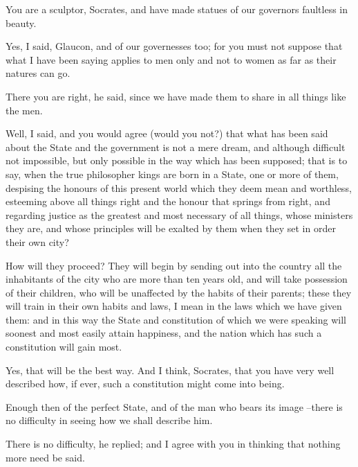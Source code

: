 You are a sculptor, Socrates, and have made statues of our governors faultless in beauty.

Yes, I said, Glaucon, and of our governesses too; for you must not suppose that what I have been saying applies to men only and not to women as far as their natures can go.

There you are right, he said, since we have made them to share in all things like the men.

Well, I said, and you would agree (would you not?) that what has been said about the State and the government is not a mere dream, and although difficult not impossible, but only possible in the way which has been supposed; that is to say, when the true philosopher kings are born in a State, one or more of them, despising the honours of this present world which they deem mean and worthless, esteeming above all things right and the honour that springs from right, and regarding justice as the greatest and most necessary of all things, whose ministers they are, and whose principles will be exalted by them when they set in order their own city?

How will they proceed?
They will begin by sending out into the country all the inhabitants of the city who are more than ten years old, and will take possession of their children, who will be unaffected by the habits of their parents; these they will train in their own habits and laws, I mean in the laws which we have given them: and in this way the State and constitution of which we were speaking will soonest and most easily attain happiness, and the nation which has such a constitution will gain most.

Yes, that will be the best way. And I think, Socrates, that you have very well described how, if ever, such a constitution might come into being.

Enough then of the perfect State, and of the man who bears its image --there is no difficulty in seeing how we shall describe him.

There is no difficulty, he replied; and I agree with you in thinking that nothing more need be said.